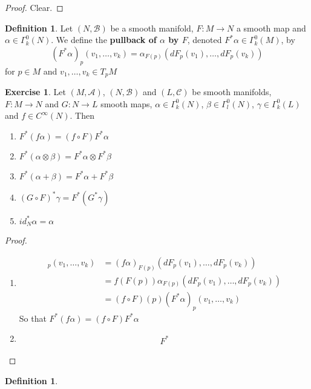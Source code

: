 \documentclass{book}
\theoremstyle{definition}
\newtheorem{defn}[definition]{Definition}
\newtheorem{ex}[definition]{Exercise}
\newcommand{\al}{\alpha}
\newcommand{\be}{\beta}
\newcommand{\gam}{\gamma}
\newcommand{\Gam}{\Gamma}
\newcommand{\MA}{\mathcal{A}}
\newcommand{\MB}{\mathcal{B}}
\newcommand{\MC}{\mathcal{C}}
\DeclareMathOperator*{\0}{\mbf{0}}
\DeclareMathOperator*{\1}{\mbf{1}}
\begin{document}
	\begin{proof}
	Clear.
	\end{proof}
	
	\begin{defn}
	Let $(N, \MB)$ be a smooth manifold, $F:M \rightarrow N$ a smooth map and $\al \in \Gam^0_k(N)$. We define the \textbf{pullback of $\al$ by $F$}, denoted $F^*\al \in \Gam^0_k(M)$, by  $$(F^*\al)_p(v_1, \dots, v_k) = \al_{F(p)} (dF_p(v_1), \dots, dF_p(v_k))$$ for $p \in M$ and $v_1, \dots, v_k \in T_pM$
	\end{defn}

	\begin{ex}
	Let $(M, \MA)$, $(N, \MB)$ and $(L, \MC)$ be smooth manifolds, $F:M \rightarrow N$ and $G:N \rightarrow L$ smooth maps, $\al \in \Gam^0_k(N)$, $\be  \in \Gam^0_l(N)$, $\gam \in \Gam^0_k(L)$ and $f \in C^{\infty}(N)$. Then 
	\begin{enumerate}
	\item $F^*(f \al) = (f \circ F) F^* \al$
	\item $F^*(\al \otimes \be) = F^*\al \otimes F^* \be$
	\item $F^*(\al + \be) = F^* \al + F^* \be $
	\item $(G \circ F)^*\gam = F^*(G^* \gam)$
	\item $id_N^* \al = \al$
	\end{enumerate}
	\end{ex}
	
	\begin{proof}\
	\begin{enumerate}
	\item 
	\begin{align*}
	[F^*(f \al)]_p(v_1, \dots, v_k) 
	&= (f \al )_{F(p)}(dF_p(v_1), \dots, dF_p(v_k)) \\
	&= f (F(p)) \al_{F(p)} (dF_p(v_1), \dots, dF_p(v_k)) \\
	&= (f \circ F)(p) (F^*\al)_p(v_1, \dots, v_k)
	\end{align*}
	So that $F^*(f \al) = (f \circ F) F^* \al$
	\item 
	\begin{align*}
		F^*
	\end{align*}
	\end{enumerate}
	
	\end{proof}
	
	
	
	
	
	\begin{defn}
	
	\end{defn}
\end{document}
